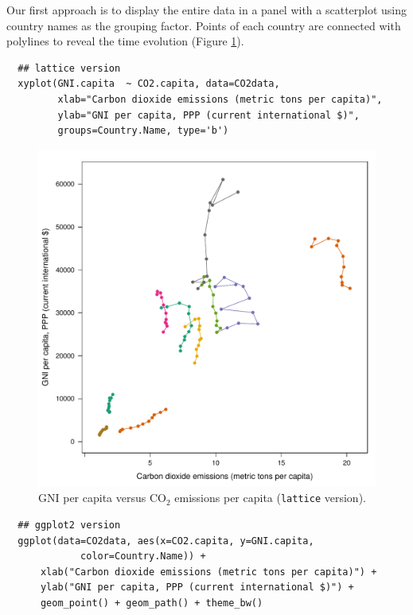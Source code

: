 \documentclass[smallroyalvopaper]{memoir}
\begin{document}
Our first approach is to display the entire data in a panel with a
scatterplot using country names as the grouping factor. Points of each
country are connected with polylines to reveal the time evolution
(Figure \ref{fig:CO2-GNI}).
\lstset{language=r,label= ,caption= ,captionpos=b,numbers=none}
\begin{lstlisting}
  ## lattice version
  xyplot(GNI.capita  ~ CO2.capita, data=CO2data,
         xlab="Carbon dioxide emissions (metric tons per capita)",
         ylab="GNI per capita, PPP (current international $)",
         groups=Country.Name, type='b')
\end{lstlisting}

\begin{figure}[htbp]
\centering
\includegraphics[width=.9\linewidth]{figs/CO2_GNI.pdf}
\caption{GNI per capita versus \(\mathrm{CO_2}\) emissions per capita (\texttt{lattice} version). \label{fig:CO2-GNI}}
\end{figure}

\lstset{language=r,label= ,caption= ,captionpos=b,numbers=none}
\begin{lstlisting}
  ## ggplot2 version
  ggplot(data=CO2data, aes(x=CO2.capita, y=GNI.capita,
             color=Country.Name)) +
      xlab("Carbon dioxide emissions (metric tons per capita)") +
      ylab("GNI per capita, PPP (current international $)") +
      geom_point() + geom_path() + theme_bw()
\end{lstlisting}
\end{document}
